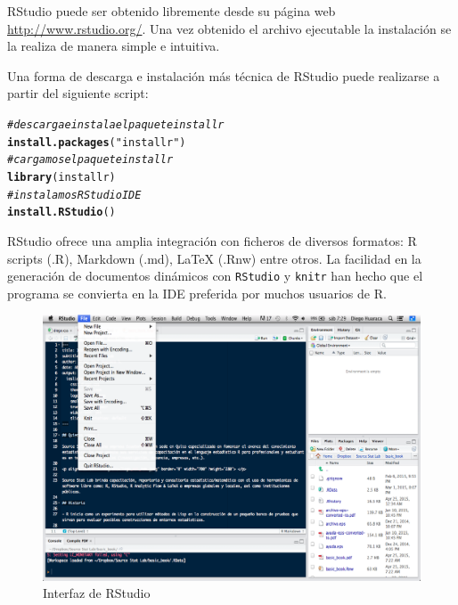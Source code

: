 \documentclass[11pt,a4paper,oneside]{book}\usepackage[]{graphicx}\usepackage[]{color}
\makeatletter
\newcommand{\hlstr}[1]{\textcolor[rgb]{0.192,0.494,0.8}{#1}}%
\newcommand{\hlcom}[1]{\textcolor[rgb]{0.678,0.584,0.686}{\textit{#1}}}%
\newcommand{\hlstd}[1]{\textcolor[rgb]{0.345,0.345,0.345}{#1}}%
\newcommand{\hlkwd}[1]{\textcolor[rgb]{0.737,0.353,0.396}{\textbf{#1}}}%
\newenvironment{kframe}{%
 \def\at@end@of@kframe{}%
 \ifinner\ifhmode%
  \def\at@end@of@kframe{\end{minipage}}%
  \begin{minipage}{\columnwidth}%
 \fi\fi%
 \def\FrameCommand##1{\hskip\@totalleftmargin \hskip-\fboxsep
 \colorbox{shadecolor}{##1}\hskip-\fboxsep
     \hskip-\linewidth \hskip-\@totalleftmargin \hskip\columnwidth}%
 \MakeFramed {\advance\hsize-\width
   \@totalleftmargin\z@ \linewidth\hsize
   \@setminipage}}%
 {\par\unskip\endMakeFramed%
 \at@end@of@kframe}
\newenvironment{knitrout}{}{} %
\makeatother
\begin{document}
\begin{itemize}
RStudio puede ser obtenido libremente desde su página web \url{http://www.rstudio.org/}. Una vez obtenido el archivo ejecutable la instalación se la realiza de manera simple e intuitiva.\newline

Una forma de descarga e instalación más técnica de RStudio puede realizarse a partir del siguiente script:
\begin{knitrout}
\color{fgcolor}\begin{kframe}
\begin{alltt}
\hlcom{# descarga e instala el paquete installr}
\hlkwd{install.packages}\hlstd{(}\hlstr{"installr"}\hlstd{)}
\hlcom{# cargamos el paquete installr}
\hlkwd{library}\hlstd{(installr)}
\hlcom{# instalamos RStudio IDE}
\hlkwd{install.RStudio}\hlstd{()}
\end{alltt}
\end{kframe}
\end{knitrout}

RStudio ofrece una amplia integración con ficheros de diversos formatos: R scripts (.R), Markdown (.md), LaTeX (.Rnw) entre otros. La facilidad en la generación de documentos dinámicos con \texttt{RStudio} y \texttt{knitr} han hecho que el programa se convierta en la IDE preferida por muchos usuarios de R.\newline

\begin{figure}[H]
\centering
\includegraphics[scale=.40]{figuras/rstudio.eps}
\caption{Interfaz de RStudio}
\label{rstudio}
\end{figure}


\end{itemize}
\end{document}
